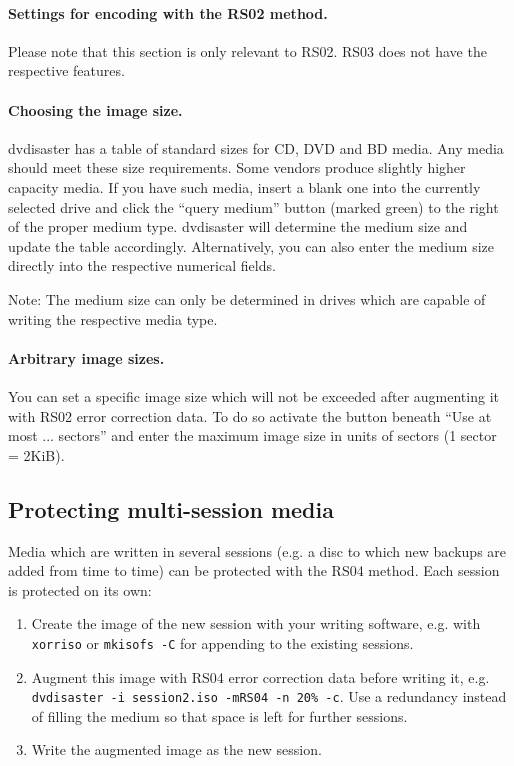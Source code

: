\vspace*{-8mm}

\paragraph{Settings for encoding with the RS02 method.}\quad
\label{howto-augment-advanced-settings-rs02}

Please note that this section is only relevant to RS02.
RS03 does not have the respective features.

\paragraph{Choosing the image size.} dvdisaster has a table of
standard sizes for CD, DVD and BD media. Any media should meet
these size requirements. Some vendors produce slightly higher
capacity media. If you have such media, insert a blank one into
the currently selected drive and click the ``query medium'' button
(marked green) to the right of the proper medium type. dvdisaster
will determine the medium size and update the table accordingly.
Alternatively, you can also enter the medium size directly into the
respective numerical fields.

Note: The medium size can only be determined in drives which are
capable of writing the respective media type.

\paragraph{Arbitrary image sizes.} You can set a specific image
size which will not be exceeded after augmenting it with RS02
error correction data. To do so activate the button beneath
``Use at most ... sectors'' and enter the maximum image size
in units of sectors (1 sector = 2KiB).

\newpage
\subsection{Protecting multi-session media}
\label{howto-multisession}

Media which are written in several sessions (e.g. a disc to which new backups are added
from time to time) can be protected with the RS04 method. Each session is protected on its own:

\begin{enumerate}
\item Create the image of the new session with your writing software, e.g.
  with {\tt xorriso} or {\tt mkisofs -C} for appending to the existing sessions.
\item Augment this image with RS04 error correction data before writing it,
  e.g. {\tt dvdisaster -i session2.iso -mRS04 -n 20\% -c}. Use a redundancy instead of filling
  the medium so that space is left for further sessions.
\item Write the augmented image as the new session.
\end{enumerate}

